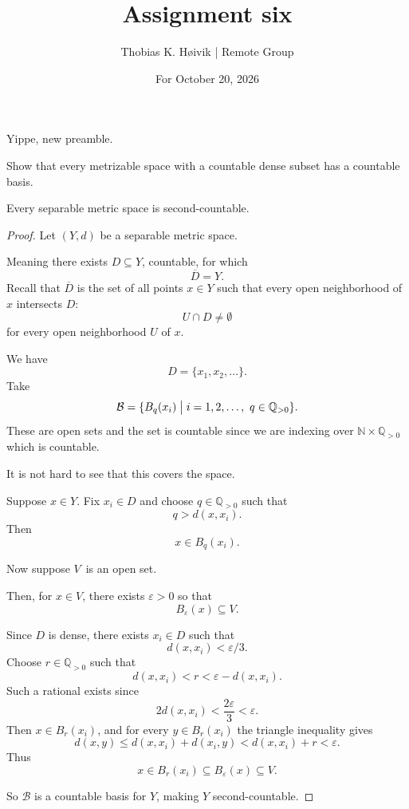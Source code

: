 \documentclass[11pt]{article}
\title{Assignment six}
\author{Thobias K. H\o ivik | Remote Group}
\date{For October 20, 2026} %
\begin{document}
\maketitle
Yippe, new preamble. 

\begin{prob*}[Munkres 30.5(a)]
    Show that every metrizable space with a countable 
    dense subset has a countable basis. 
\end{prob*}

\begin{lem*}
    Every separable metric space is 
    second-countable. 
\end{lem*}
\begin{proof}
    Let $(Y,d)$ be a separable metric space. 

    Meaning there exists $D \subseteq Y$, countable, 
    for which 
    \[
        \overline D = Y. 
    \]
    Recall that $\overline D$ is the set of all 
    points $x \in Y$ such that every open 
    neighborhood of $x$ intersects 
    $D$: 
    \[
        U \cap D \neq \emptyset   
    \]
    for every open neighborhood $U$ of $x$. 

    We have 
    \[
        D = \{x_1,x_2,\ldots\}. 
    \]
    Take 
    \[
        \mathcal B = \{B_{q}(x_i) \bigm| i = 1,2,\ldots, \ 
        q \in \mathbb Q_{>0}\}. 
    \]
    These are open sets and the 
    set is countable since we are indexing over 
    $\mathbb N \times \mathbb Q_{>0}$ which is 
    countable. 

    It is not hard to see that this covers the space. 

    Suppose $x \in Y$. 
    Fix $x_i \in D$ and choose $q \in \mathbb Q_{>0}$ such that 
    \[
        q > d(x,x_i). 
    \]
    Then 
    \[
        x \in B_{q}(x_i). 
    \]

    Now suppose $V$ is an open set. 

    Then, for $x \in V$, there exists $\varepsilon > 0$ 
    so that 
    \[
        B_{\varepsilon}(x) \subseteq V. 
    \]

    Since $D$ is dense, there exists 
    $x_i \in D$ such that 
    \[
        d(x,x_i) < \varepsilon/3. 
    \]
    Choose $r \in \mathbb Q_{>0}$ such that 
    \[
        d(x,x_i) < r < \varepsilon - d(x,x_i). 
    \]
    Such a rational exists since 
    \[
        2d(x,x_i) < \frac{2\varepsilon}{3} < \varepsilon. 
    \]
    Then $x \in B_r(x_i)$, and for every $y \in B_r(x_i)$ 
    the triangle inequality gives 
    \[
        d(x,y) \leq d(x,x_i) + d(x_i,y) < d(x,x_i) + r < 
        \varepsilon. 
    \]
    Thus 
    \[
        x \in B_r(x_i) \subseteq B_{\varepsilon}(x) 
        \subseteq V. 
    \]

    So $\mathcal B$ is a countable basis for $Y$, making 
    $Y$ second-countable. 

\end{proof}
\end{document}
